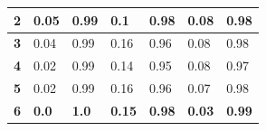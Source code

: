 \begin{table}[h!]
\begin{tabular}{|l|l|l|l|l|l|l|}
\textbf{2}                                                         & 0.05                                                                      & 0.99                                                                       & 0.1                                                                    & 0.98                                                                    & 0.08                                                               & 0.98                                                                \\ \hline
\textbf{3}                                                         & 0.04                                                                      & 0.99                                                                       & 0.16                                                                   & 0.96                                                                    & 0.08                                                               & 0.98                                                                \\ \hline
\textbf{4}                                                         & 0.02                                                                      & 0.99                                                                       & 0.14                                                                   & 0.95                                                                    & 0.08                                                               & 0.97                                                                \\ \hline
\textbf{5}                                                         & 0.02                                                                      & 0.99                                                                       & 0.16                                                                   & 0.96                                                                    & 0.07                                                               & 0.98                                                                \\ \hline
\textbf{6}                                                         & \textbf{0.0}                                                              & \textbf{1.0}                                                               & \textbf{0.15}                                                          & \textbf{0.98}                                                           & \textbf{0.03}                                                      & \textbf{0.99}                                                       \\ \hline

\end{tabular}
\end{table}

